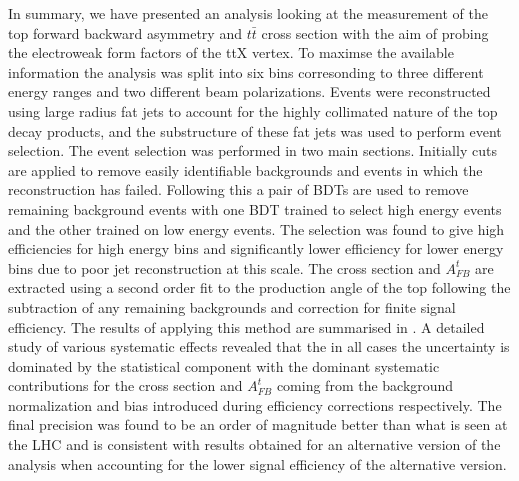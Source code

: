 In summary, we have presented an analysis looking at the measurement of the top forward backward asymmetry and $t\bar{t}$ cross section with the aim of probing the electroweak form factors of the ttX vertex. To maximse the available information the analysis was split into six bins corresonding to three different energy ranges and two different beam polarizations. Events were reconstructed using large radius fat jets to account for the highly collimated nature of the top decay products, and the substructure of these fat jets was used to perform event selection. The event selection was performed in two main sections. Initially cuts are applied to remove easily identifiable backgrounds and events in which the reconstruction has failed. Following this a pair of \ac{BDT}s are used to remove remaining background events with one \ac{BDT} trained to select high energy events and the other trained on low energy events. The selection was found to give high efficiencies for high energy bins and significantly lower efficiency for lower energy bins due to poor jet reconstruction at this scale. The cross section and $A_{FB}^t$ are extracted using a second order fit to the production angle of the top following the subtraction of any remaining backgrounds and correction for finite signal efficiency. The results of applying this method are summarised in . A detailed study of various systematic effects revealed that the in all cases the uncertainty is dominated by the statistical component with the dominant systematic contributions for the cross section and $A_{FB}^t$ coming from the background normalization and bias introduced during efficiency corrections respectively. The final precision was found to be an order of magnitude better than what is seen at the \ac{LHC}\cite{Bai:2011uk} and is consistent with results obtained for an alternative version of the analysis\cite{TopPaperDraft} when accounting for the lower signal efficiency of the alternative version.

